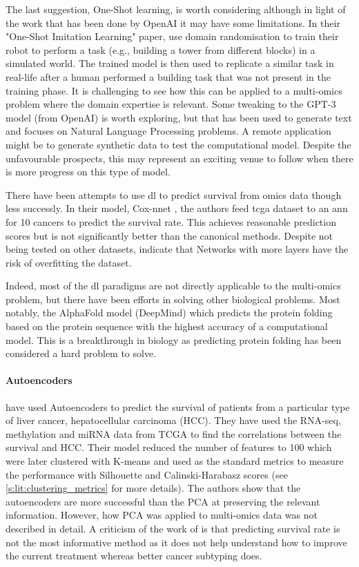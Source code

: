 The last suggestion, One-Shot learning, is worth considering although in light of the work that has been done by OpenAI it may have some limitations. In their "One-Shot Imitation Learning" paper, \citet{duan2017-ae} use domain randomisation to train their robot to perform a task (e.g., building a tower from different blocks) in a simulated world. The trained model is then used to replicate a similar task in real-life after a human performed a building task that was not present in the training phase. It is challenging to see how this can be applied to a multi-omics problem where the domain expertise is relevant. Some tweaking to the GPT-3\cite{Brown2020-wh} model (from OpenAI) is worth exploring, but that has been used to generate text and focuses on Natural Language Processing problems. A remote application might be to generate synthetic data to test the computational model. Despite the unfavourable prospects, this may represent an exciting venue to follow when there is more progress on this type of model.

There have been attempts to use \acrshort{dl} to predict survival from omics data though less successly. In their model, Cox-nnet \cite{Ching2018-gq}, the authors feed \acrshort{tcga} dataset to an \acrshort{ann} for 10 cancers to predict the survival rate. This achieves reasonable prediction scores but is not significantly better than the canonical methods. Despite not being tested on other datasets, \citet{Ching2018-gq} indicate that Networks with more layers have the risk of overfitting the dataset.  


Indeed, most of the \acrshort{dl} paradigms are not directly applicable to the multi-omics problem, but there have been efforts in solving other biological problems. Most notably, the AlphaFold model\cite{Jumper2021-du} (DeepMind) which predicts the protein folding based on the protein sequence with the highest accuracy of a computational model. This is a breakthrough in biology as predicting protein folding has been considered a hard problem to solve.


\paragraph*{Autoencoders} \label{s:lit:autoencoders}

\citet{Chaudhary2018-qj} have used Autoencoders to predict the survival of patients from a particular type of liver cancer, hepatocellular carcinoma (HCC). They have used the RNA-seq, methylation and miRNA data from TCGA to find the correlations between the survival and HCC. Their model reduced the number of features to 100 which were later clustered with K-means and used as the standard metrics to measure the performance with Silhouette and Calinski-Harabasz scores (see \cref{s:lit:clustering_metrics} for more details). The authors show that the autoencoders are  more successful than the PCA at preserving the relevant information. However, how PCA was applied to multi-omics data was not described in detail. A criticism of the work of \citet{Chaudhary2018-qj} is that predicting survival rate is not the most informative method as it does not help understand how to improve the current treatment whereas better cancer subtyping does.

